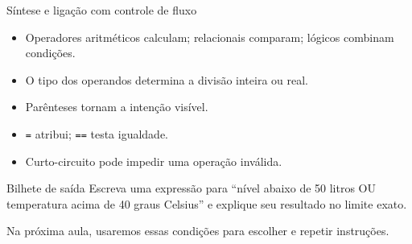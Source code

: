 \begin{frame}{Síntese e ligação com controle de fluxo}
\begin{itemize}
\item Operadores aritméticos calculam; relacionais comparam; lógicos combinam condições.
\item O tipo dos operandos determina a divisão inteira ou real.
\item Parênteses tornam a intenção visível.
\item \texttt{=} atribui; \texttt{==} testa igualdade.
\item Curto-circuito pode impedir uma operação inválida.
\end{itemize}
\begin{block}{Bilhete de saída}
Escreva uma expressão para ``nível abaixo de 50 litros OU temperatura acima de 40 graus Celsius'' e explique seu resultado no limite exato.
\end{block}
Na próxima aula, usaremos essas condições para escolher e repetir instruções.
\end{frame}
